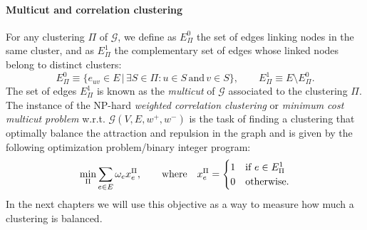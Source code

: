 \paragraph{Multicut and correlation clustering} For any clustering $\Pi$ of $\mathcal{G}$, we define as $E^0_\Pi$ the set of edges linking nodes in the same cluster, and as $E_\Pi^1$ the complementary set of edges whose linked nodes belong to distinct clusters:
\begin{equation}
E_\Pi^0 \equiv \{ e_{uv} \in E \,|\, \exists S \in \Pi : u \in S \, \text{and} \, v \in S \}, \qquad E^1_\Pi \equiv E \setminus E^0_\Pi.
\end{equation}
The set of edges $E_\Pi^1$ is known as the \emph{multicut} of $\mathcal{G}$ associated to the clustering $\Pi$. The instance of the NP-hard \emph{weighted correlation clustering} or \emph{minimum cost multicut problem} w.r.t. $\mathcal{G}(V,E,w^+, w^-)$ \cite{kappes2011globally,chopra1991multiway,andres2015lifting} is the task of finding a clustering that optimally balance the attraction and repulsion in the graph and is given by the following optimization problem/binary integer program:
\begin{equation}
 \min_\Pi \sum_{e\in E} \omega_e x_e^\Pi,  \qquad \text{where} \quad x^\Pi_e = 
 \begin{cases} 
 1 & \text{if } e\in E^1_\Pi \\
 0 & \text{otherwise}.
 \end{cases}
\end{equation}
In the next chapters we will use this objective as a way to measure how much a clustering is balanced.

